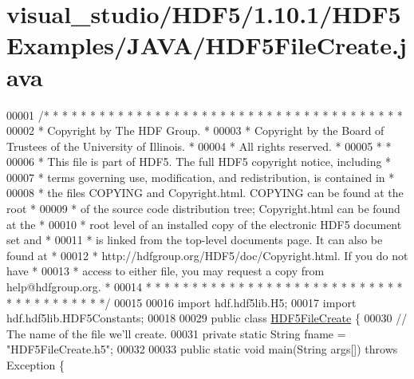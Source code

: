 \hypertarget{visual__studio_2_h_d_f5_21_810_81_2_h_d_f5_examples_2_j_a_v_a_2_h_d_f5_file_create_8java_source}{}\section{visual\+\_\+studio/\+H\+D\+F5/1.10.1/\+H\+D\+F5\+Examples/\+J\+A\+V\+A/\+H\+D\+F5\+File\+Create.java}
\label{visual__studio_2_h_d_f5_21_810_81_2_h_d_f5_examples_2_j_a_v_a_2_h_d_f5_file_create_8java_source}

\begin{DoxyCode}
00001 \textcolor{comment}{/* * * * * * * * * * * * * * * * * * * * * * * * * * * * * * * * * * * * * * *}
00002 \textcolor{comment}{ * Copyright by The HDF Group.                                               *}
00003 \textcolor{comment}{ * Copyright by the Board of Trustees of the University of Illinois.         *}
00004 \textcolor{comment}{ * All rights reserved.                                                      *}
00005 \textcolor{comment}{ *                                                                           *}
00006 \textcolor{comment}{ * This file is part of HDF5.  The full HDF5 copyright notice, including     *}
00007 \textcolor{comment}{ * terms governing use, modification, and redistribution, is contained in    *}
00008 \textcolor{comment}{ * the files COPYING and Copyright.html.  COPYING can be found at the root   *}
00009 \textcolor{comment}{ * of the source code distribution tree; Copyright.html can be found at the  *}
00010 \textcolor{comment}{ * root level of an installed copy of the electronic HDF5 document set and   *}
00011 \textcolor{comment}{ * is linked from the top-level documents page.  It can also be found at     *}
00012 \textcolor{comment}{ * http://hdfgroup.org/HDF5/doc/Copyright.html.  If you do not have          *}
00013 \textcolor{comment}{ * access to either file, you may request a copy from help@hdfgroup.org.     *}
00014 \textcolor{comment}{ * * * * * * * * * * * * * * * * * * * * * * * * * * * * * * * * * * * * * * */}
00015 
00016 \textcolor{keyword}{import} hdf.hdf5lib.H5;
00017 \textcolor{keyword}{import} hdf.hdf5lib.HDF5Constants;
00018 
00029 \textcolor{keyword}{public} \textcolor{keyword}{class }\hyperlink{class_h_d_f5_file_create}{HDF5FileCreate} \{
00030     \textcolor{comment}{// The name of the file we'll create.}
00031     \textcolor{keyword}{private} \textcolor{keyword}{static} String fname = \textcolor{stringliteral}{"HDF5FileCreate.h5"};
00032 
00033     \textcolor{keyword}{public} \textcolor{keyword}{static} \textcolor{keywordtype}{void} main(String args[]) \textcolor{keywordflow}{throws} Exception \{

\end{DoxyCode}
